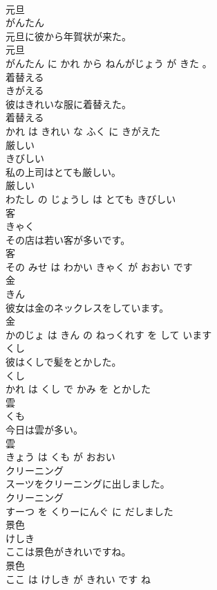 \documentclass[8pt]{extreport}
\begin{document}
\begin{CJK}{UTF8}{min}
\\	元旦	
\\	がんたん			
\\	元旦に彼から年賀状が来た。	
\\	元旦 
\\	がんたん に かれ から ねんがじょう が きた 。			
\\	着替える	
\\	きがえる			
\\	彼はきれいな服に着替えた。	
\\	着替える 
\\	かれ は きれい な ふく に きがえた			
\\	厳しい	
\\	きびしい			
\\	私の上司はとても厳しい。	
\\	厳しい 
\\	わたし の じょうし は とても きびしい			
\\	客	
\\	きゃく			
\\	その店は若い客が多いです。	
\\	客 
\\	その みせ は わかい きゃく が おおい です			
\\	金	
\\	きん			
\\	彼女は金のネックレスをしています。	
\\	金 
\\	かのじょ は きん の ねっくれす を して います			
\\	くし	
\\	彼はくしで髪をとかした。	
\\	くし 
\\	かれ は くし で かみ を とかした			
\\	雲	
\\	くも			
\\	今日は雲が多い。	
\\	雲 
\\	きょう は くも が おおい			
\\	クリーニング	
\\	スーツをクリーニングに出しました。	
\\	クリーニング 
\\	すーつ を くりーにんぐ に だしました			
\\	景色	
\\	けしき			
\\	ここは景色がきれいですね。	
\\	景色 
\\	ここ は けしき が きれい です ね			

\end{CJK}
\end{document}
